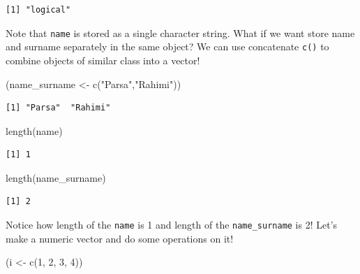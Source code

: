 \documentclass[
  letterpaper,
]{book}
\newenvironment{Shaded}{\begin{snugshade}}{\end{snugshade}}
\newcommand{\DecValTok}[1]{\textcolor[rgb]{0.68,0.00,0.00}{#1}}
\newcommand{\FunctionTok}[1]{\textcolor[rgb]{0.28,0.35,0.67}{#1}}
\newcommand{\NormalTok}[1]{\textcolor[rgb]{0.00,0.23,0.31}{#1}}
\newcommand{\OtherTok}[1]{\textcolor[rgb]{0.00,0.23,0.31}{#1}}
\newcommand{\StringTok}[1]{\textcolor[rgb]{0.13,0.47,0.30}{#1}}
\begin{document}
\begin{verbatim}
[1] "logical"
\end{verbatim}

Note that \texttt{name} is stored as a single character string. What if
we want store name and surname separately in the same object? We can use
concatenate \texttt{c()} to combine objects of similar class into a
vector!

\begin{Shaded}
\begin{Highlighting}[]
\NormalTok{(name\_surname }\OtherTok{\textless{}{-}} \FunctionTok{c}\NormalTok{(}\StringTok{"Parsa"}\NormalTok{,}\StringTok{"Rahimi"}\NormalTok{))}
\end{Highlighting}
\end{Shaded}

\begin{verbatim}
[1] "Parsa"  "Rahimi"
\end{verbatim}

\begin{Shaded}
\begin{Highlighting}[]
\FunctionTok{length}\NormalTok{(name) }
\end{Highlighting}
\end{Shaded}

\begin{verbatim}
[1] 1
\end{verbatim}

\begin{Shaded}
\begin{Highlighting}[]
\FunctionTok{length}\NormalTok{(name\_surname)}
\end{Highlighting}
\end{Shaded}

\begin{verbatim}
[1] 2
\end{verbatim}

Notice how length of the \texttt{name} is 1 and length of the
\texttt{name\_surname} is 2! Let's make a numeric vector and do some
operations on it!

\begin{Shaded}
\begin{Highlighting}[]
\NormalTok{(i }\OtherTok{\textless{}{-}} \FunctionTok{c}\NormalTok{(}\DecValTok{1}\NormalTok{, }\DecValTok{2}\NormalTok{, }\DecValTok{3}\NormalTok{, }\DecValTok{4}\NormalTok{))}
\end{Highlighting}
\end{Shaded}
\end{document}

